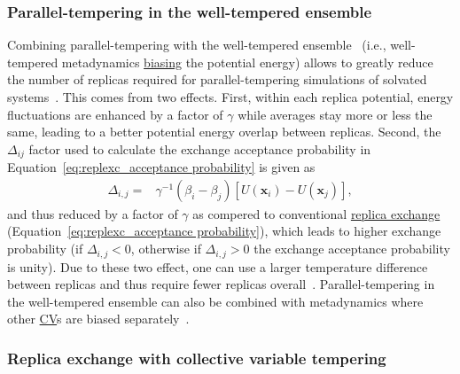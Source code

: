 \documentclass[9pt,review]{livecoms}
\newcommand{\vx}{\mathbf{x}}
\begin{document}
\subsubsection{Parallel-tempering in the well-tempered ensemble}
\label{sec:pt-wte}
Combining parallel-tempering with the well-tempered ensemble~\cite{Bonomi-PRL-2010} (i.e., well-tempered metadynamics \hyperlink{ref:biasingE} {biasing} the potential energy) allows to greatly reduce the number of replicas required for parallel-tempering simulations of solvated systems~\cite{Deighan2012_ptwte_efficient}. This comes from two effects. First, within each replica potential, energy fluctuations are enhanced by a factor of $\gamma$ while averages stay more or less the same, leading to a better potential energy overlap between replicas. Second, the $\Delta_{ij}$ factor used to calculate the exchange acceptance probability in Equation~\ref{eq:replexc_acceptance probability} is given as
\begin{align}
\Delta_{i,j} = &
\gamma^{-1}
\left(\beta_{i} - \beta_{j}\right)
\left[U(\vx_{i}) - U(\vx_{j})\right],
\end{align}
and thus reduced by a factor of $\gamma$ as compered to conventional \hyperlink{ref:ReplEx} {replica exchange} (Equation~\ref{eq:replexc_acceptance probability}),  which leads to higher exchange probability (if $\Delta_{i,j}<0$, otherwise if $\Delta_{i,j}>0$ the exchange acceptance probability is unity). Due to these two effect, one can use a larger temperature difference between replicas and thus require fewer replicas overall~\cite{Deighan2012_ptwte_efficient}. Parallel-tempering in the well-tempered ensemble can also be combined with metadynamics where other \hyperlink{ref:CV} {CV}s are biased separately~\cite{10.1073/pnas.1320077110}.

\subsubsection{Replica exchange with collective variable tempering}
\end{document}
